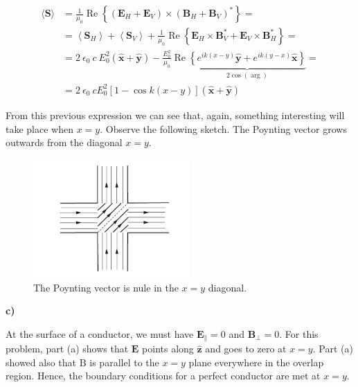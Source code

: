 \begin{equation}
	\begin{split}
		\langle\mathbf{S}\rangle &=\frac{1}{ \mu_{0}} \operatorname{Re}\left\{\left(\mathbf{E}_{H}+\mathbf{E}_{V}\right) \times\left(\mathbf{B}_{H}+\mathbf{B}_{V}\right)^{*}\right\}= \\
		&=\left\langle\mathbf{S}_{H}\right\rangle+\left\langle\mathbf{S}_{V}\right\rangle+\frac{1}{ \mu_{0}} \operatorname{Re}\left\{\mathbf{E}_{H} \times \mathbf{B}_{V}^{*}+\mathbf{E}_{V} \times \mathbf{B}_{H}^{*}\right\} =\\
		&= 2\: \epsilon_{0} \:c \: E_{0}^{2}(\hat{\mathbf{x}}+\hat{\mathbf{y}})-\frac{E_{0}^{2}  }{ \mu_{0}} \operatorname{Re}\underbrace{\left\{e^{i k(x-y)} \hat{\mathbf{y}}+e^{i k(y-x)} \hat{\mathbf{x}}\right\}}_{2\cos(\arg)} =\\
		&=2\:\epsilon_{0}\:c E_{0}^{2}[1- \cos k(x-y)](\hat{\mathbf{x}}+\hat{\mathbf{y}})
	\end{split}
\end{equation}

From this previous expression we can see that, again, something interesting will take place when $x=y$. Observe the following sketch. The Poynting vector grows outwards from the diagonal $x=y$.

\begin{figure}[h!]
	\includegraphics[width=6cm]{figures/electrocrosswalk.png}
	\centering
	\caption{The Poynting vector is nule in the $x=y$ diagonal.}
\end{figure}

\textbf{c)}

At the surface of a conductor, we must have $\mathbf{E}_{\|}=0$ and $\mathbf{B}_{\perp}=0$. For this problem, part (a) shows that $\mathbf{E}$ points along $\hat{\mathbf{z}}$ and goes to zero at $x=y .$ Part (a) showed also that $\mathrm{B}$ is parallel to the $x=y$ plane everywhere in the overlap region. Hence, the boundary conditions for a perfect conductor are met at $x=y$.




